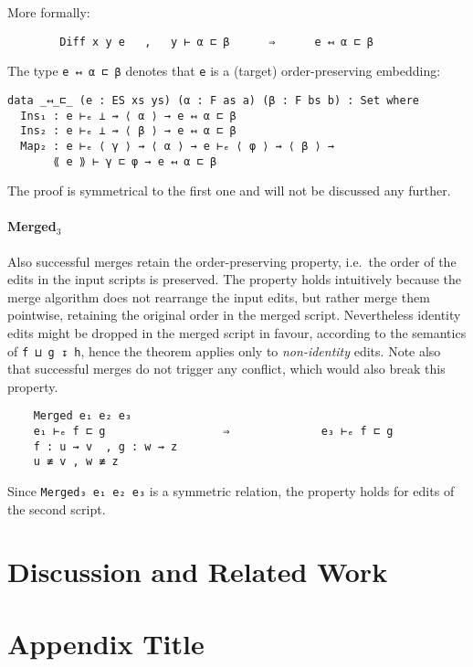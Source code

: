 \documentclass[preprint]{sigplanconf}
\begin{document}
    More formally:
\begin{verbatim}
        Diff x y e   ,   y ⊢ α ⊏ β      ⇒      e ↤ α ⊏ β
\end{verbatim}

    The type \texttt{e ↤ α ⊏ β} denotes that \texttt{e} is a (target) 
    order-preserving embedding:

\begin{verbatim}
data _↤_⊏_ (e : ES xs ys) (α : F as a) (β : F bs b) : Set where
  Ins₁ : e ⊢ₑ ⊥ ⇝ ⟨ α ⟩ → e ↤ α ⊏ β
  Ins₂ : e ⊢ₑ ⊥ ⇝ ⟨ β ⟩ → e ↤ α ⊏ β
  Map₂ : e ⊢ₑ ⟨ γ ⟩ ⇝ ⟨ α ⟩ → e ⊢ₑ ⟨ φ ⟩ ⇝ ⟨ β ⟩ → 
       ⟪ e ⟫ ⊢ γ ⊏ φ → e ↤ α ⊏ β
\end{verbatim}

    The proof is symmetrical to the first one and will not be discussed any further.

    \paragraph{Merged$_3$}
    Also successful merges retain the order-preserving property, i.e.\
    the order of the edits in the input scripts is preserved.
    The property holds intuitively because the merge algorithm
    does not rearrange the input edits, 
    but rather merge them pointwise, retaining the original order in the merged 
    script.
    Nevertheless identity edits might be dropped in the merged script in favour,
    according to the semantics of \texttt{f ⊔ g ↧ h}, hence
    the theorem applies only to \emph{non-identity} edits.
    Note also that successful merges do not trigger any conflict, which
    would also break this property.

\begin{verbatim}
    Merged e₁ e₂ e₃
    e₁ ⊢ₑ f ⊏ g                  ⇒              e₃ ⊢ₑ f ⊏ g
    f : u ⇝ v  , g : w ⇝ z  
    u ≢ v , w ≢ z
\end{verbatim}
    Since \texttt{Merged₃ e₁ e₂ e₃} is a symmetric relation, the property holds 
    for edits of the second script. 

\section{Discussion and Related Work}
\label{sec:related-work}

\appendix
\section{Appendix Title}
\end{document}

